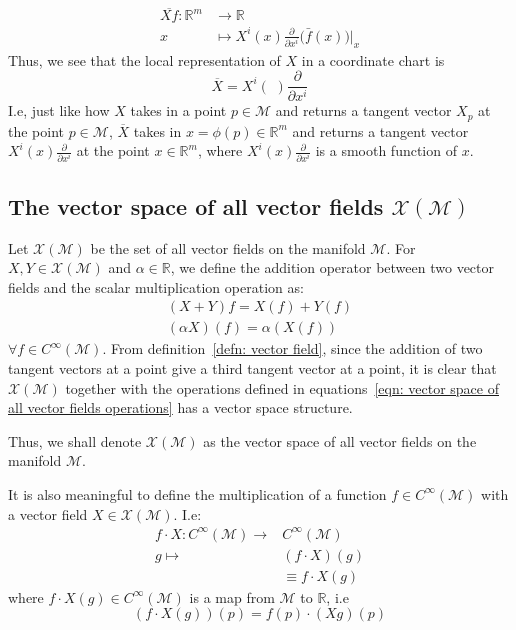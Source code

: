 \begin{remark}
\begin{enumerate}
{\begin{align*}
          \overline{Xf}:
          \mathbb{R}^m
          &\rightarrow \mathbb{R}\\
          x &\mapsto X^i(x) \frac{\partial}{\partial
          x^i}\Big(\bar{f}(x)\Big)\bigr|_{x}
        \end{align*}
        Thus, we see that the local representation of $X$ in a coordinate
        chart is \[\overline{X} = X^i(\,\,) \frac{\partial}{\partial x^i}\]
        I.e, just like how $X$ takes in a point $p \in \mathcal{M}$ and returns a tangent vector $X_p$ at the point $p \in \mathcal{M}$, 
        $\overline{X}$ takes in $x =\phi(p) \in \mathbb{R}^m$ and returns a
        tangent vector $X^i(x) \frac{\partial}{\partial x^i}$ at the point $x
        \in \mathbb{R}^m$, where $X^i(x) \frac{\partial}{\partial x^i}$ is a smooth function of $x$.}
      \end{enumerate}
    \end{remark}
  \subsection*{The vector space of all vector fields
    $\mathcal{X}(\mathcal{M})$}
    Let $\mathcal{X}(\mathcal{M})$ be the set of all vector fields on the
    manifold $\mathcal{M}$. For $X,Y \in \mathcal{X}(\mathcal{M})$ and
    $\alpha \in \mathbb{R}$, we define the addition operator between two vector fields and the scalar multiplication operation as:
    \begin{subequations}
      \label{eqn: vector space of all vector fields operations}
      \begin{gather}
        (X + Y)f = X(f) + Y(f) \\
        (\alpha X)(f) = \alpha (X(f))
      \end{gather}
    \end{subequations}
    $\forall f\in C^\infty(\mathcal{M})$. From definition~\ref{defn:
    vector field}, since the addition of two tangent vectors at a point
    give a third tangent vector at a point, it is clear that
    $\mathcal{X}(\mathcal{M})$ together with the operations defined in
    equations~\ref{eqn: vector space of all vector fields operations} has a
    vector space structure.

    Thus, we shall denote $\mathcal{X}(\mathcal{M})$ as the vector space of all vector fields on the manifold $\mathcal{M}$.

    It is also meaningful to define the multiplication of a function $f \in
    C^\infty(\mathcal{M})$ with a vector field $X \in
    \mathcal{X}(\mathcal{M})$. I.e:
    \begin{align*}
    f\cdot X: C^\infty(\mathcal{M}) \rightarrow& C^\infty(\mathcal{M}) \\
    g\mapsto&
    (f\cdot X)(g)\\
    &\equiv f\cdot X(g)
    \end{align*}
    where $f\cdot X(g) \in C^\infty(\mathcal{M})$ is a map from
    $\mathcal{M}$ to $\mathbb{R}$, i.e \[ \left(f\cdot X(g)\right)(p) =
    f(p)\cdot(Xg)(p)\]

